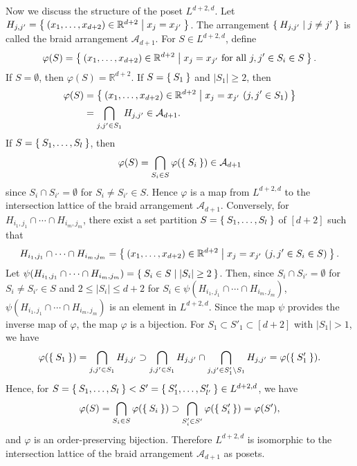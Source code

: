 \documentclass{wstmp}
\begin{document}
Now we discuss the structure of the poset $L^{d+2,d}$.
Let $H_{j,j'}=\Set{(x_1,\ldots,x_{d+2}) \in {\mathbb{R}}^{d+2}| x_j = x_{j'}}$.
The arrangement $\Set{H_{j,j'}| j\neq j'}$ is called the braid arrangement
${\mathcal{A}}_{d+1}$.
For $S \in L^{d+2,d}$,
define 
\begin{align*}
\varphi(S)= \Set{(x_1,\ldots,x_{d+2}) \in {\mathbb{R}}^{d+2}| \text{$x_j=x_{j'}$ for all $j,j' \in S_i \in S$}}.
\end{align*}
If $S=\emptyset$, then $\varphi(S)={\mathbb{R}}^{d+2}$.
If $S=\Set{S_1}$ and ${\left|{S_1}\right|}\geq 2$, then 
\begin{align*}
\varphi(S)&=\Set{(x_1,\ldots,x_{d+2}) \in {\mathbb{R}}^{d+2}| x_j=x_{j'}\ (j,j' \in S_1)}\\
&=\bigcap_{j, j' \in S_1} H_{j,j'} \in {\mathcal{A}}_{d+1}.
\end{align*}
If $S=\Set{S_1,\ldots,S_l}$, then 
\begin{align*}
\varphi(S)=\bigcap_{S_i \in S} \varphi(\Set{S_i}) \in {\mathcal{A}}_{d+1}
\end{align*}
since $S_i \cap S_{i'} =\emptyset$ for $S_i \neq S_{i'} \in S$.
Hence $\varphi$ is a map from $L^{d+2,d}$ to the
intersection lattice of the braid arrangement ${\mathcal{A}}_{d+1}$.
Conversely, for $H_{i_1,j_1}\cap \cdots \cap H_{i_m,j_m}$,
there exist a set partition $S=\Set{S_1,\ldots,S_l}$ of $[d+2]$
such that 
\begin{align*}
H_{i_1,j_1}\cap \cdots \cap H_{i_m,j_m}
= \Set{(x_1,\ldots,x_{d+2}) \in {\mathbb{R}}^{d+2}| x_j=x_{j'} \ (j,j' \in S_i \in S)}.
\end{align*}
Let 
$\psi(H_{i_1,j_1}\cap \cdots \cap H_{i_m,j_m})=\Set{S_i \in S|{\left|{S_i}\right|}\geq 2}$.
Then,
since $S_i\cap S_{i'}=\emptyset$ for $S_i\neq S_{i'} \in S$
and $2 \leq {\left|{S_i}\right|} \leq d+2$ for $S_i \in \psi(H_{i_1,j_1}\cap \cdots \cap H_{i_m,j_m})$,
 $\psi(H_{i_1,j_1}\cap \cdots \cap H_{i_m,j_m})$ is an element in 
 $L^{d+2,d}$.
Since the map $\psi$ provides the inverse map of $\varphi$,
the map $\varphi$ is a bijection.
For $S_1\subset S'_1 \subset [d+2]$ with ${\left|{S_1}\right|}>1$,
we have
\begin{align*}
\varphi(\Set{S_1})=\bigcap_{j,j' \in S_1} H_{j,j'}
\supset 
\bigcap_{j,j' \in S_1} H_{j,j'} \cap \bigcap_{j,j' \in S'_1 \setminus S_1} H_{j,j'}
=\varphi(\Set{S'_1}).
\end{align*}
Hence, for 
$S=\Set{S_1,\ldots,S_l} < S'= \Set{ S'_1,\ldots,S'_{l'}} \in L^{d+2,d}$,
we have
\begin{align*}
\varphi(S)=\bigcap_{S_i \in S} \varphi(\Set{S_i}) \supset
\bigcap_{S'_i \in S'} \varphi(\Set{S'_i})= 
\varphi(S'),
\end{align*}
and $\varphi$ is an order-preserving bijection.
Therefore $L^{d+2,d}$ is isomorphic to 
the intersection lattice of the braid arrangement ${\mathcal{A}}_{d+1}$
as posets.
\end{document}

